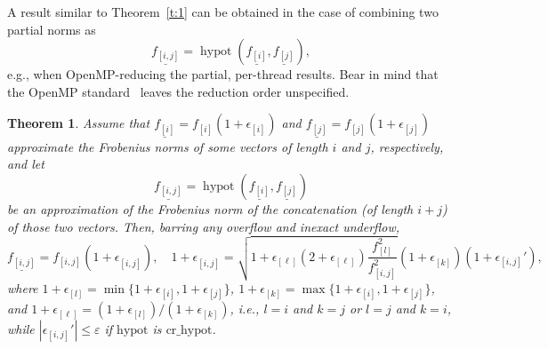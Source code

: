 \documentclass[a4paper,12pt,twoside]{article}
\newtheorem{thm}{Theorem}
\begin{document}
A result similar to Theorem~\ref{t:1} can be obtained in the case of
combining two partial norms as
\begin{displaymath}
  \underline{f_{[i,j]}}=\mathop{\mathrm{hypot}}(\underline{f_{[i]}},\underline{f_{[j]}}),
\end{displaymath}
e.g., when OpenMP-reducing the partial, per-thread results.  Bear in
mind that the OpenMP standard~\cite[\S 7.6.7]{OpenMP6} leaves the
reduction order unspecified.

\begin{thm}\label{t:2}
  Assume that $\underline{f_{[i]}}=f_{[i]}(1+\epsilon_{[i]})$ and
  $\underline{f_{[j]}}=f_{[j]}(1+\epsilon_{[j]})$ approximate the
  Frobenius norms of some vectors of length $i$ and $j$, respectively,
  and let
  \begin{displaymath}
    \underline{f_{[i,j]}}=\mathop{\mathrm{hypot}}(\underline{f_{[i]}},\underline{f_{[j]}})
  \end{displaymath}
  be an approximation of the Frobenius norm of the concatenation (of
  length $i+j$) of those two vectors.  Then, barring any overflow and
  inexact underflow,
  \begin{equation}
    \underline{f_{[i,j]}^{}}=f_{[i,j]^{}}(1+\epsilon_{[i,j]}^{}),\quad
    1+\epsilon_{[i,j]}^{}=\sqrt{1+\epsilon_{[\ell]}(2+\epsilon_{[\ell]})\frac{f_{[l]}^2}{f_{[i,j]}^2}}(1+\epsilon_{[k]}^{})(1+\epsilon_{[i,j]}'),
    \label{e:8}
  \end{equation}
  where
  $1+\epsilon_{[l]}=\min\{1+\epsilon_{[i]},1+\epsilon_{[j]}\}$,
  $1+\epsilon_{[k]}=\max\{1+\epsilon_{[i]},1+\epsilon_{[j]}\}$, and
  $1+\epsilon_{[\ell]}=(1+\epsilon_{[l]})/(1+\epsilon_{[k]})$, i.e.,
  $l=i$ and $k=j$ or $l=j$ and $k=i$, while
  $|\epsilon_{[i,j]}'|\le\varepsilon$ if $\mathrm{hypot}$ is
  $\mathrm{cr\_hypot}$.
\end{thm}
\end{document}
